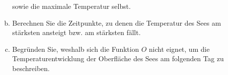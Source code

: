 \begin{exercise}
\begin{enumerate}[a)]
            sowie die maximale Temperatur selbst.
      \item Berechnen Sie die Zeitpunkte, zu denen die Temperatur
            des Sees am stärksten ansteigt bzw. am stärksten fällt.
        \item Begründen Sie, weshalb sich die Funktion $O$ nicht eignet,
              um die Temperaturentwicklung der Oberfläche des Sees am
              folgenden Tag zu beschreiben.
    \end{enumerate}
  \fi
\end{exercise}
